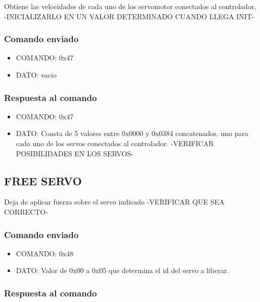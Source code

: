 \documentclass[a4paper,11pt]{article}
\begin{document}
Obtiene las velocidades de cada uno de los servomotor conectados al controlador. -INICIALIZARLO EN UN VALOR DETERMINADO CUANDO LLEGA INIT-

\subsubsection*{Comando enviado}
\label{get_all_velocities_comando_enviado}

\begin{itemize}
	\item{COMANDO:} 0x47
	\item{DATO:} vacio
\end{itemize}

\subsubsection*{Respuesta al comando}
\label{get_all_velocities_respuesta}

\begin{itemize}
	\item{COMANDO:} 0x47
	\item{DATO:} Consta de 5 valores entre 0x0000 y 0x0384 concatenados, uno para cada uno de los servos conectados al controlador.
	-VERIFICAR POSIBILIDADES EN LOS SERVOS-
\end{itemize}

\subsection{FREE SERVO}
\label{free_servo}

Deja de aplicar fuerza sobre el servo indicado -VERIFICAR QUE SEA CORRECTO-

\subsubsection*{Comando enviado}
\label{free_servo_comando_enviado}

\begin{itemize}
	\item{COMANDO:} 0x48
	\item{DATO:} Valor de 0x00 a 0x05 que determina el id del servo a liberar.
\end{itemize}

\subsubsection*{Respuesta al comando}
\label{free_servo_respuesta}
\end{document}
